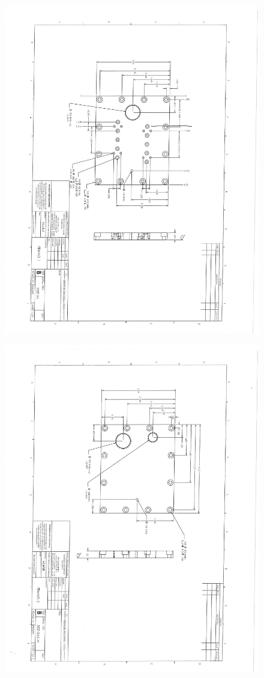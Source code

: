 \begin{figure}[h!]
	\centering
	\includegraphics[width=0.9\linewidth]{figures/dms/DMS_drawings_02.pdf}
\end{figure}

\begin{figure}[h!]
	\centering
	\includegraphics[width=0.9\linewidth]{figures/dms/DMS_drawings_03.pdf}
\end{figure}

